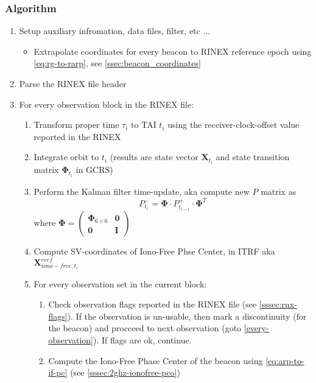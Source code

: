 \subsubsection{Algorithm}
\begin{enumerate}
  \item Setup auxiliary infromation, data files, filter, etc ...
  \begin{itemize}
    \item Extrapolate coordinates for every beacon to RINEX reference epoch using \ref{eq:rg-to-rarp}, see \ref{ssec:beacon_coordinates}
  \end{itemize}

  \item Parse the RINEX file header

  \item For every observation block in the RINEX file:
    \begin{enumerate}\label{every-block}
      \item Transform proper time $\tau _i$ to TAI $t_i$ using the receiver-clock-offset 
        value reported in the RINEX
      \item Integrate orbit to $t_i$ (results are state vector $\bm{X}_{t_i}$ and state 
        transition matrix $\bm{\Phi}_{t_i}$ in GCRS)
      \item Perform the Kalman filter time-update, aka compute new $P$ matrix as 
        \begin{equation}
          P^- _{t_i} = \bm{\Phi} \cdot P^+ _{t_{i-1}} \cdot \bm{\Phi}^T
        \end{equation}
        where $\bm{\Phi} = \begin{pmatrix} \bm{\Phi}_{6\times 6} & \bm{0} \\ \bm{0} & \bm{I} \end{pmatrix}$
        \item Compute SV-coordinates of Iono-Free Phse Center, in ITRF aka $\bm{X}^{ecef}_{iono-free,t_i}$
        \item For every observation set in the current block:
          \begin{enumerate}\label{every-observation}
            \item Check observation flags reported in the RINEX file (see \ref{sssec:rnx-flags}). 
              If the observation is un-usable, then mark a discontinuity (for the beacon) and procceed 
              to next observation (goto \ref{every-observation}). If flags are ok, continue.
            \item Compute the Iono-Free Phase Center of the beacon using \ref{eq:arp-to-if-pc} (see \ref{sssec:2ghz-ionofree-pco}) 

\end{enumerate}
\end{enumerate}
\end{enumerate}
